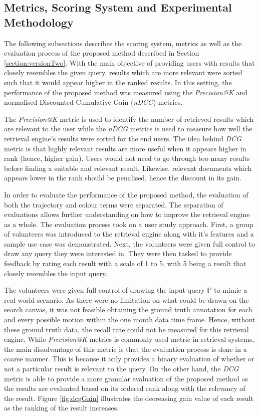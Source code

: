 \subsection{Metrics, Scoring System and Experimental Methodology}

The following subsections describes the scoring system, metrics as well as the
evaluation process of the proposed method described in Section
\ref{section:versionTwo}. With the main objective of providing users with
results that closely resembles the given query, results which are more relevant
were sorted such that it would appear higher in the ranked results. In this
setting, the performance of the proposed method was measured using the
\textit{Precision@K} and normalised Discounted Cumulative Gain (\textit{nDCG})
metrics.

The \textit{Precision@K} metric is used to identify the number of retrieved
results which are relevant to the user while the \textit{nDCG} metrics is used
to measure how well the retrieval engine's results were sorted for the end
users. The idea behind \textit{DCG} metric is that highly relevant results are
more useful when it appears higher in rank (hence, higher gain). Users would
not need to go through too many results before finding a suitable and relevant
result. Likewise, relevant documents which appears lower in the rank should be
penalised, hence the discount in its gain.

In order to evaluate the performance of the proposed method, the evaluation of
both the trajectory and colour terms were separated. The separation of
evaluations allows further understanding on how to improve the retrieval engine
as a whole. The evaluation process took on a user study approach.
First, a group of volunteers was introduced to the retrieval engine along with
it's features and a sample use case was demonstrated. Next, the volunteers were
given full control to draw any query they were interested in. They were then
tasked to provide feedback by rating each result with a scale of 1 to 5, with
5 being a result that closely resembles the input query.

The volunteers were given full control of drawing the input query $\mathbb{P}$
to mimic a real world scenario. As there were no limitation on what could be
drawn on the search canvas, it was not feasible obtaining the ground truth
annotation for each and every possible motion within the one month data time
frame. Hence, without these ground truth data, the recall rate could not be
measured for this retrieval engine.
While \textit{Precision@K} metrics is commonly used metric in retrieval
systems, the main disadvantage of this metric is that the evaluation process
is done in a coarse manner. This is because it only provides a binary
evaluation of whether or not a particular result is relevant to the query. On
the other hand, the \textit{DCG} metric is able to provide a more granular
evaluation of the proposed method as the results are evaluated based on its
ordered rank along with the relevancy of the result. Figure \ref{fig:dcgGain}
illustrates the decreasing gain value of each result as the ranking of the
result increases.

